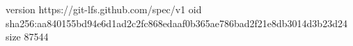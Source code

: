 version https://git-lfs.github.com/spec/v1
oid sha256:aa840155bd94e6d1ad2c2fc868edaaf0b365ae786bad2f21e8db3014d3b23d24
size 87544
